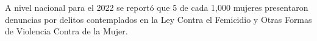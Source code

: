 \justifying A nivel nacional para el 2022 se reportó que 5 de cada 1,000 mujeres presentaron denuncias por delitos contemplados en la Ley Contra el Femicidio y Otras Formas de Violencia Contra de la Mujer.